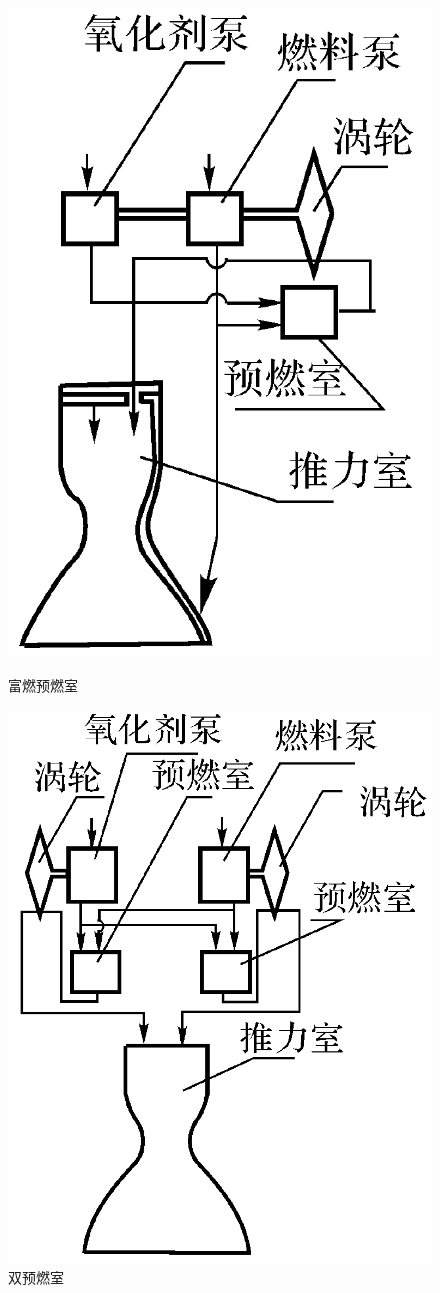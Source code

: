 {\begin{figure}[!htb]
\begin{minipage}{0.33\linewidth}
			\includegraphics[width=0.695\linewidth]{pic/富燃预燃.png}
			\caption{富燃预燃室}
		\end{minipage}
		\begin{minipage}{0.33\linewidth}
			\centering
			\includegraphics[width=0.82\linewidth]{pic/双预燃.png}
			\caption{双预燃室}
		\end{minipage}
	\end{figure}
}

